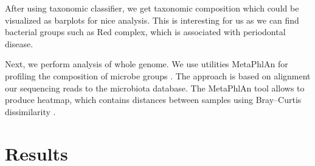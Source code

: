 \documentclass{article}
\begin{document}
 After using taxonomic classifier, we get taxonomic composition which could be visualized as barplots for nice analysis. This is interesting for us as we can find bacterial groups such as Red complex, which is associated with periodontal disease. 
 
 Next, we perform analysis of whole genome. We use utilities MetaPhlAn for profiling the composition of microbe groups \cite{Met}. The approach is based on alignment our sequencing reads to the microbiota database. The MetaPhlAn tool allows to produce  heatmap, which contains distances between samples using Bray–Curtis dissimilarity \cite{BC}.
 
 \section{Results}








 
 
\end{document}
